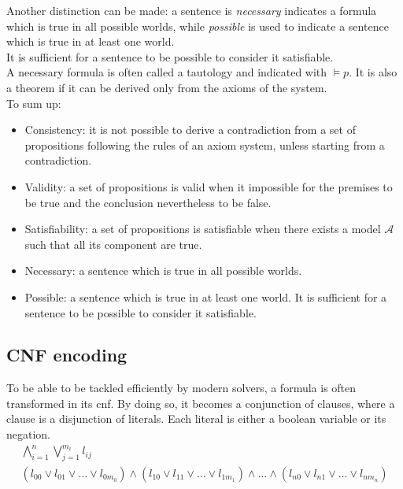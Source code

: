 Another distinction can be made: a sentence is \textit{necessary} indicates a formula which is true in all possible worlds, while \textit{possible} is used to indicate a sentence which is true in at least one world. \\
It is sufficient for a sentence to be possible to consider it satisfiable. \\
A necessary formula is often called a tautology and indicated with $\models p$.
It is also a theorem if it can be derived only from the axioms of the system. \\

To sum up:
\begin{itemize}
    \item Consistency: it is not possible to derive a contradiction from a set of propositions following the rules of an axiom system, unless starting from a contradiction.
    \item Validity: a set of propositions is valid when it impossible for the premises to be true and the conclusion nevertheless to be false.
    \item Satisfiability: a set of propositions is satisfiable when there exists a model $\mathcal{A}$ such that all its component are true.
    \item Necessary: a sentence which is true in all possible worlds.
    \item Possible: a sentence which is true in at least one world. It is sufficient for a sentence to be possible to consider it satisfiable.
\end{itemize}

\subsection{CNF encoding}

To be able to be tackled efficiently by modern solvers, a formula is often transformed in its \gls{cnf}.
By doing so, it becomes a conjunction of clauses, where a clause is a disjunction of literals. Each literal is either a boolean variable or its negation. \\

\begin{gather*}
    \bigwedge_{i=1}^n \bigvee_{j=1}^{m_i} l_{ij} \\
    ( l_{00} \lor l_{01} \lor \dots \lor l_{0m_0}) \land (l_{10} \lor l_{11} \lor \dots \lor l_{1m_1}) \land \dots \land (l_{n0} \lor l_{n1} \lor \dots \lor l_{nm_n})
\end{gather*}


